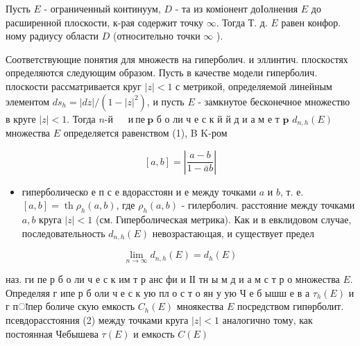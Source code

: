 \documentclass[10pt]{article}
\begin{document}
Пусть $E$ - ограниченный континуум, $D$ - та из коміонент доІолнения $E$ до расширенной плоскости, к-рая содержит точку $\infty$. Тогда Т. д. $E$ равен конфор. ному радиусу области $D$ (относительно точки $\infty$ ).



Соответствующие понятия для множеств на гиперболич. и эллинтич. плоскостях определяются следующим образом. Пусть в качестве модели гиперболич. плоскости рассматривается круг $|z|<1$ с метрикой, определяемой линейным элементом $d s_{h}=|d z| /\left(1-|z|^{2}\right)$, и пусть $E$ - замкнутое бесконечное множество в круге $|z|<1$. Тогда $n$-й $\quad \mathbf{~ и ~ п е ~} \mathbf{p}$ б о ли ч е с к й й д и а м е т $\mathbf{p}$ $d_{n, h}(E)$ множества $E$ определяется равенством (1), B K-ром



\[

[a, b]=\left|\frac{a-b}{1-\bar{a} b}\right|

\]



\begin{itemize}

  \item гиперболическо е п с е вдорасстоян и е между точками $a$ и $b$, т. е. $[a, b]=\operatorname{th} \rho_{h}(a, b)$, где $\rho_{h}(a, b)$ - гилерболич. расстояние между точками $a, b$ круга $|z|<1$ (см. Гиперболическая метрика). Как и в евклидовом случае, последовательность $d_{n, h}(E)$ невозрастаюıцая, и существует предел

\end{itemize}



\[

\lim _{n \rightarrow \infty} d_{n, h}(E)=d_{h}(E)

\]



наз. ги пе р б о ли ч е с к им т р анс фи и ІІ тн ы м д и а м с т р о множества $E$. Определяя г ипе р б оли ч е с к ую пл о с т о ян у ую Ч е б ышш е в а $\tau_{h}(E)$ и г пाпер боличе скую емкость $C_{h}(E)$ мноякества $E$ посредством гипөрболит. псевдорасстояния (2) между точками круга $|z|<1$ аналогично тому, как постоянная Чебышева $\tau(E)$ и емкость $C(E)$
\end{document}
